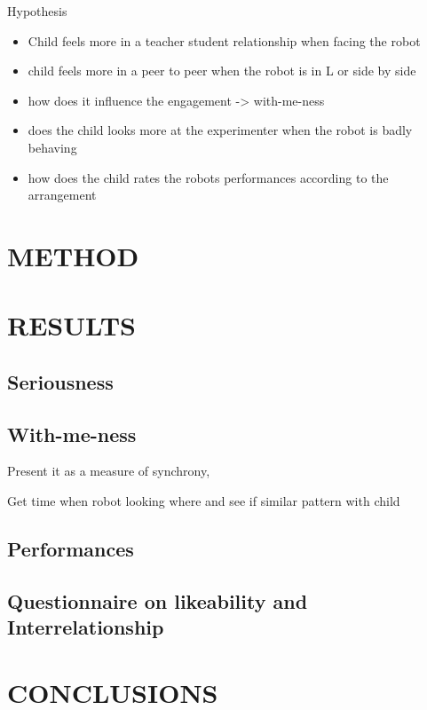 \documentclass[letterpaper, 10 pt, conference]{ieeeconf}  %
\begin{document}
Hypothesis
\begin{itemize}
\item Child feels more in a teacher student relationship when facing the robot
\item child feels more in a peer to peer when the robot is in L or side by side 
\item how does it influence the engagement -> with-me-ness
\item  does the child looks more at the experimenter when the robot is badly behaving
\item how does the child rates the robots performances according to  the arrangement
\end{itemize}


\section{METHOD}

\section{RESULTS}

\subsection{Seriousness}

\subsection{With-me-ness}
Present it as a measure of synchrony, 

Get time when robot looking where and see if similar pattern with child

\subsection{Performances}

\subsection{Questionnaire on likeability and Interrelationship}

\section{CONCLUSIONS}



\addtolength{\textheight}{-12cm}   %
\end{document}
